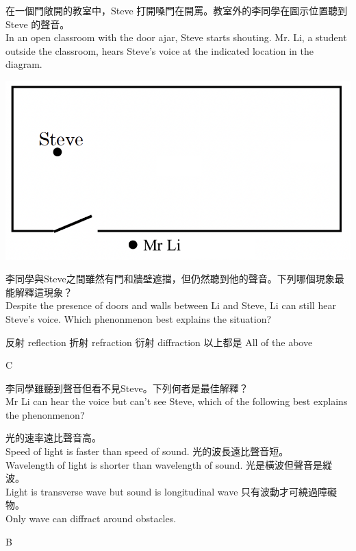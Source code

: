 {
    在一個門敞開的教室中，Steve 打開嗓門在開罵。教室外的李同學在圖示位置聽到 Steve 的聲音。\\In an open classroom with the door ajar, Steve starts shouting. Mr. Li, a student outside the classroom, hears Steve's voice at the indicated location in the diagram.
    \par{\par\centering\includegraphics[width=.4\textwidth]{./img/ch2_weekend_mc_2024-05-31-19-11-06.png}\par}
    李同學與Steve之間雖然有門和牆壁遮擋，但仍然聽到他的聲音。下列哪個現象最能解釋這現象？\\Despite the presence of doors and walls between Li and Steve, Li can still hear Steve's voice. Which phenonmenon best explains the situation?
    \begin{tasks}
        \task 反射 reflection
        \task 折射 refraction
        \task 衍射 diffraction
        \task 以上都是 All of the above
    \end{tasks}

}{C}

{
    李同學雖聽到聲音但看不見Steve。下列何者是最佳解釋？\\Mr Li can hear the voice but can't see Steve, which of the following best explains the phenonmenon?
    \begin{tasks}
        \task 光的速率遠比聲音高。\\Speed of light is faster than speed of sound.
        \task 光的波長遠比聲音短。\\Wavelength of light is shorter than wavelength of sound.
        \task 光是橫波但聲音是縱波。\\Light is transverse wave but sound is longitudinal wave
        \task 只有波動才可繞過障礙物。\\Only wave can diffract around obstacles.
    \end{tasks}
}{B}